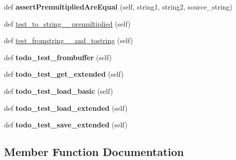 \begin{DoxyCompactItemize}
def {\bfseries assert\+Premultiplied\+Are\+Equal} (self, string1, string2, source\+\_\+string)
\item 
def \hyperlink{classpygame_1_1tests_1_1image__test_1_1_image_module_test_a9b9ceaeae75e22a5650adc592d5e68af}{test\+\_\+to\+\_\+string\+\_\+\+\_\+premultiplied} (self)
\item 
def \hyperlink{classpygame_1_1tests_1_1image__test_1_1_image_module_test_ad5d5efeb163145a7c50c4f668f068e9a}{test\+\_\+fromstring\+\_\+\+\_\+and\+\_\+tostring} (self)
\item 
\mbox{\label{classpygame_1_1tests_1_1image__test_1_1_image_module_test_aca90039a95191e84816ea9b43a6f1455}} 
def {\bfseries todo\+\_\+test\+\_\+frombuffer} (self)
\item 
\mbox{\label{classpygame_1_1tests_1_1image__test_1_1_image_module_test_ace27fcc3ee908b0e31d9677874f168cd}} 
def {\bfseries todo\+\_\+test\+\_\+get\+\_\+extended} (self)
\item 
\mbox{\label{classpygame_1_1tests_1_1image__test_1_1_image_module_test_a3178c1c66594bf073ad7cefdbc4eefe4}} 
def {\bfseries todo\+\_\+test\+\_\+load\+\_\+basic} (self)
\item 
\mbox{\label{classpygame_1_1tests_1_1image__test_1_1_image_module_test_ab0d26f25f4042511a483c4f0d686d0e3}} 
def {\bfseries todo\+\_\+test\+\_\+load\+\_\+extended} (self)
\item 
\mbox{\label{classpygame_1_1tests_1_1image__test_1_1_image_module_test_acf7ccbed4626be4e386f5a5425bc4041}} 
def {\bfseries todo\+\_\+test\+\_\+save\+\_\+extended} (self)
\end{DoxyCompactItemize}


\subsection{Member Function Documentation}
\mbox{\label{classpygame_1_1tests_1_1image__test_1_1_image_module_test_ad5d5efeb163145a7c50c4f668f068e9a}} 
